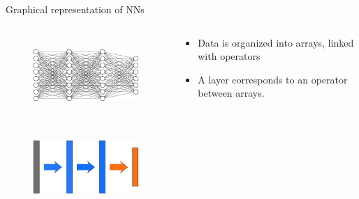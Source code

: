 \documentclass[xcolor=pdftex,dvipsnames,table,mathserif]{beamer}
\begin{document}
\begin{frame}{Graphical representation of NNs}

  \begin{columns}
    \begin{column}{.5\textwidth}
      \begin{figure}
        \includegraphics[height=3cm]{mini_reseau3_bis}
      \end{figure}
      \begin{figure}
        \includegraphics[height=3cm]{nn_representation3}
      \end{figure}
    \end{column}

    \begin{column}{.5\textwidth}
      \begin{itemize}
      \item<2-> Data is organized into arrays, linked with operators
      \item<3-> A layer corresponds to an operator between arrays.
      \end{itemize}
    \end{column}
  \end{columns}

\end{frame}
\end{document}
